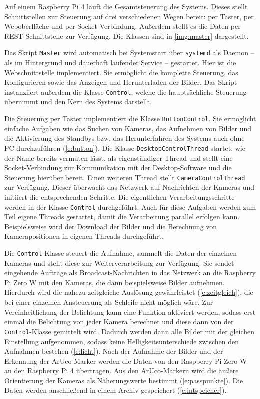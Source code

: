 \documentclass[./00PhotoBox.tex]{subfiles}
\begin{document}
Auf einem Raspberry Pi 4 läuft die Gesamt\-steuerung des Systems. Dieses stellt Schnitt\-stellen zur Steuerung auf drei verschiedenen Wegen bereit: per Taster, per Weboberfläche und per Socket-Verbindung. Außerdem stellt es die Daten per REST-Schnittstelle  zur Verfügung. Die Klassen sind in \autoref{img:master} dargestellt.

Das Skript \texttt{Master} wird automatisch bei Systemstart über \texttt{systemd} als Daemon -- als im Hintergrund und dauerhaft laufender Service \citep[S. 369]{negus2020linux} -- gestartet. Hier ist die Webschnittstelle implementiert. Sie ermöglicht die komplette Steuerung, das Konfigurieren sowie das Anzeigen und Herunterladen der Bilder. Das Skript instanziiert außerdem die Klasse \texttt{Control}, welche die hauptsächliche Steuerung übernimmt und den Kern des Systems darstellt.

Die Steuerung per Taster implementiert die Klasse \texttt{ButtonControl}. Sie ermöglicht einfache Aufgaben wie das Suchen von Kameras, das Aufnehmen von Bilder und die Aktivierung des Standbys bzw. das Herunterfahren des Systems auch ohne PC durchzuführen (\autoref{e:button}). Die Klasse \texttt{DesktopControlThread} startet, wie der Name bereits vermuten lässt, als eigenständiger Thread und stellt eine Socket-Verbindung zur Kommunikation mit der Desktop-Software und die Steuerung hierüber bereit. Einen weiteren Thread stellt \texttt{CameraControlThread} zur Verfügung. Dieser überwacht das Netzwerk auf Nachrichten der Kameras und initiiert die entsprechenden Schritte. Die eigentlichen Verarbeitungsschritte werden in der Klasse \texttt{Control} durchgeführt. Auch für diese Aufgaben werden zum Teil eigene Threads gestartet, damit die Verarbeitung parallel erfolgen kann. Beispielsweise wird der Download der Bilder und die Berechnung von Kamerapositionen in eigenen Threads durchgeführt.

Die \texttt{Control}-Klasse steuert die Aufnahme, sammelt die Daten der einzelnen Kameras und stellt diese zur Weiterverarbeitung zur Verfügung. Sie sendet eingehende Aufträge als Broadcast-Nachrichten in das Netzwerk an die Raspberry Pi Zero W mit den Kameras, die dann beispielsweise Bilder aufnehmen. Hierdurch wird die nahezu zeitgleiche Auslösung gewährleistet (\autoref{e:zeitgleich}), die bei einer einzelnen Ansteuerung als Schleife nicht möglich wäre. Zur Vereinheitlichung der Belichtung kann eine Funktion aktiviert werden, sodass erst einmal die Belichtung von jeder Kamera berechnet und diese dann von der \texttt{Control}-Klasse gemittelt wird. Dadurch werden dann alle Bilder mit der gleichen Einstellung aufgenommen, sodass keine Helligkeitsunterschiede zwischen den Aufnahmen bestehen (\autoref{e:licht}).
Nach der Aufnahme der Bilder und der Erkennung der ArUco-Marker werden die Daten von den Raspberry Pi Zero W an den Raspberry Pi 4 übertragen. Aus den ArUco-Markern wird die äußere Orientierung der Kameras als Näherungswerte bestimmt (\autoref{e:passpunkte}). Die Daten werden anschließend in einem Archiv gespeichert (\autoref{e:intspeicher}).
\end{document}
